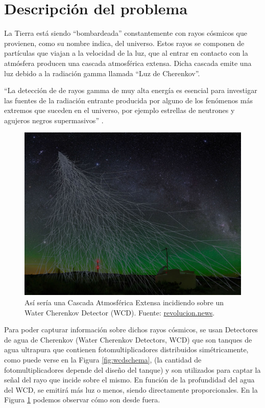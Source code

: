 \section{Descripción del problema}\label{sec:problemdesc}

La Tierra está siendo \enquote{bombardeada} constantemente con rayos cósmicos que provienen, como su nombre indica, del universo. Estos rayos se componen de partículas que viajan a la velocidad de la luz, que al entrar en contacto con la atmósfera producen una cascada atmosférica extensa. Dicha cascada emite una luz debido a la radiación gamma llamada \enquote{Luz de Cherenkov}.\newline

\enquote{La detección de de rayos gamma de muy alta energía es esencial para investigar las fuentes de la radiación entrante producida por alguno de los fenómenos más extremos que suceden en el universo, por ejemplo estrellas de neutrones y agujeros negros supermasivos} \cite{gonzalez2021tackling}.

\begin{figure}[H]
	\includegraphics[width=.8\linewidth]{imagenes/01_Introduccion/EAS.jpg}
	\centering
	\caption{Así sería una Cascada Atmosférica Extensa incidiendo sobre un Water Cherenkov Detector (WCD). Fuente: \href{https://revolucion.news/cienciario.mx/los-rayos-cosmicos-de-muy-alta-energia-vienen-de-fuera-de-la-via-lactea/}{revolucion.news}.}
	\label{fig:wcd}
\end{figure}

Para poder capturar información sobre dichos rayos cósmicos, se usan Detectores de agua de Cherenkov (Water Cherenkov Detectors, WCD) que son tanques de agua ultrapura que contienen fotomultiplicadores distribuidos simétricamente, como puede verse en la Figura \ref{fig:wcdschema}, (la cantidad de fotomultiplicadores depende del diseño del tanque) y son utilizados para captar la señal del rayo que incide sobre el mismo. En función de la profundidad del agua del WCD, se emitirá más luz o menos, siendo directamente proporcionales. En la Figura \ref{fig:wcd} podemos observar cómo son desde fuera.\newline

